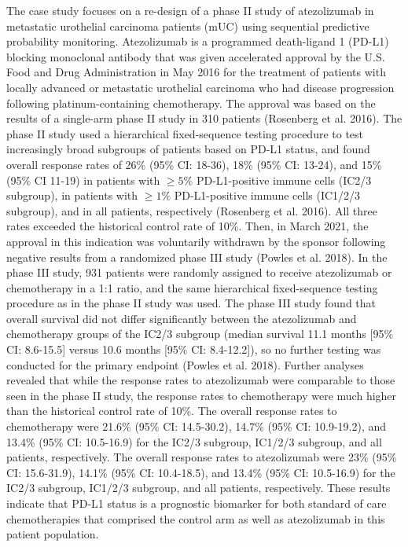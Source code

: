 The case study focuses on a re-design of a phase II study of atezolizumab in metastatic urothelial carcinoma patients (mUC) using sequential predictive probability monitoring. Atezolizumab is a programmed death-ligand 1 (PD-L1) blocking monoclonal antibody that was given accelerated approval by the U.S. Food and Drug Administration in May 2016 for the treatment of patients with locally advanced or metastatic urothelial carcinoma who had disease progression following platinum-containing chemotherapy. The approval was based on the results of a single-arm phase II study in 310 patients (Rosenberg et al. 2016). The phase II study used a hierarchical fixed-sequence testing procedure to test increasingly broad subgroups of patients based on PD-L1 status, and found overall response rates of 26\% (95\% CI: 18-36), 18\% (95\% CI: 13-24), and 15\% (95\% CI 11-19) in patients with \(\geq5\%\) PD-L1-positive immune cells (IC2/3 subgroup), in patients with \(\geq1\%\) PD-L1-positive immune cells (IC1/2/3 subgroup), and in all patients, respectively (Rosenberg et al. 2016). All three rates exceeded the historical control rate of 10\%. Then, in March 2021, the approval in this indication was voluntarily withdrawn by the sponsor following negative results from a randomized phase III study (Powles et al. 2018). In the phase III study, 931 patients were randomly assigned to receive atezolizumab or chemotherapy in a 1:1 ratio, and the same hierarchical fixed-sequence testing procedure as in the phase II study was used. The phase III study found that overall survival did not differ significantly between the atezolizumab and chemotherapy groups of the IC2/3 subgroup (median survival 11.1 months {[}95\% CI: 8.6-15.5{]} versus 10.6 months {[}95\% CI: 8.4-12.2{]}), so no further testing was conducted for the primary endpoint (Powles et al. 2018). Further analyses revealed that while the response rates to atezolizumab were comparable to those seen in the phase II study, the response rates to chemotherapy were much higher than the historical control rate of 10\%. The overall response rates to chemotherapy were 21.6\% (95\% CI: 14.5-30.2), 14.7\% (95\% CI: 10.9-19.2), and 13.4\% (95\% CI: 10.5-16.9) for the IC2/3 subgroup, IC1/2/3 subgroup, and all patients, respectively. The overall response rates to atezolizumab were 23\% (95\% CI: 15.6-31.9), 14.1\% (95\% CI: 10.4-18.5), and 13.4\% (95\% CI: 10.5-16.9) for the IC2/3 subgroup, IC1/2/3 subgroup, and all patients, respectively. These results indicate that PD-L1 status is a prognostic biomarker for both standard of care chemotherapies that comprised the control arm as well as atezolizumab in this patient population.


